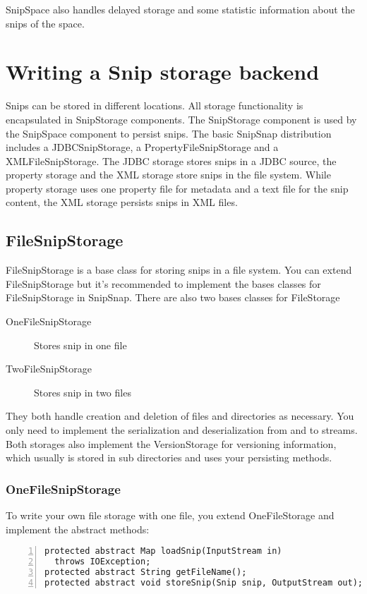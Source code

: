 \documentclass[a4paper,pdftex]{article}
\begin{document}
SnipSpace also handles delayed storage and some statistic information about the 
snips of the space.

\section{Writing a Snip storage backend}

Snips can be stored in different locations. All storage functionality
is encapsulated in SnipStorage components. The SnipStorage component is used
by the SnipSpace component to persist snips. The basic SnipSnap distribution
includes a JDBCSnipStorage, a PropertyFileSnipStorage and a XMLFileSnipStorage.
The JDBC storage stores snips in a JDBC source, the property storage and the XML storage
store snips in the file system. While property storage uses one property file for metadata and
a text file for the snip content, the XML storage persists snips in XML files.

\subsection{FileSnipStorage}

FileSnipStorage is a base class for storing snips in a file system.
You can extend FileSnipStorage but it's recommended to implement
the bases classes for FileSnipStorage in SnipSnap. There are also two bases 
classes for FileStorage

\begin{description}
\item[OneFileSnipStorage]Stores snip in one file
\item[TwoFileSnipStorage]Stores snip in two files
\end{description}

They both handle creation and deletion of files and directories as necessary.
You only need to implement the serialization and deserialization from and to
streams. Both storages also implement the VersionStorage for versioning
information, which usually is stored in sub directories and uses your
persisting methods.

\subsubsection{OneFileSnipStorage}

To write your own file storage with one file, you extend
OneFileStorage and implement the abstract methods:

\begin{Verbatim}[gobble=0,frame=single,numbers=left,fontsize=\small]
protected abstract Map loadSnip(InputStream in)
  throws IOException;
protected abstract String getFileName();
protected abstract void storeSnip(Snip snip, OutputStream out);
\end{Verbatim}
\end{document}
